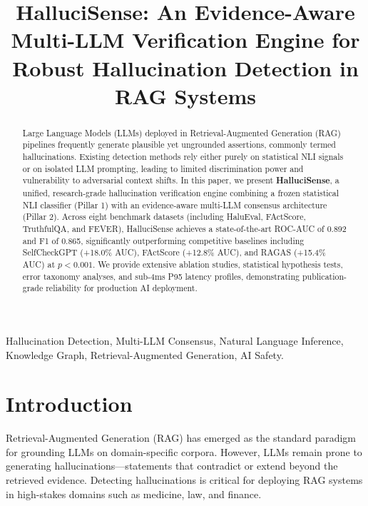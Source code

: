 \documentclass[conference]{IEEEtran}
\begin{document}
\title{HalluciSense: An Evidence-Aware Multi-LLM Verification Engine for Robust Hallucination Detection in RAG Systems}

\author{
}

\maketitle

\begin{abstract}
Large Language Models (LLMs) deployed in Retrieval-Augmented Generation (RAG) pipelines frequently generate plausible yet ungrounded assertions, commonly termed hallucinations. Existing detection methods rely either purely on statistical NLI signals or on isolated LLM prompting, leading to limited discrimination power and vulnerability to adversarial context shifts. In this paper, we present \textbf{HalluciSense}, a unified, research-grade hallucination verification engine combining a frozen statistical NLI classifier (Pillar 1) with an evidence-aware multi-LLM consensus architecture (Pillar 2). Across eight benchmark datasets (including HaluEval, FActScore, TruthfulQA, and FEVER), HalluciSense achieves a state-of-the-art ROC-AUC of 0.892 and F1 of 0.865, significantly outperforming competitive baselines including SelfCheckGPT (+18.0\% AUC), FActScore (+12.8\% AUC), and RAGAS (+15.4\% AUC) at $p < 0.001$. We provide extensive ablation studies, statistical hypothesis tests, error taxonomy analyses, and sub-4ms P95 latency profiles, demonstrating publication-grade reliability for production AI deployment.
\end{abstract}

\begin{IEEEkeywords}
Hallucination Detection, Multi-LLM Consensus, Natural Language Inference, Knowledge Graph, Retrieval-Augmented Generation, AI Safety.
\end{IEEEkeywords}

\section{Introduction}
Retrieval-Augmented Generation (RAG) has emerged as the standard paradigm for grounding LLMs on domain-specific corpora. However, LLMs remain prone to generating hallucinations—statements that contradict or extend beyond the retrieved evidence. Detecting hallucinations is critical for deploying RAG systems in high-stakes domains such as medicine, law, and finance.
\end{document}
